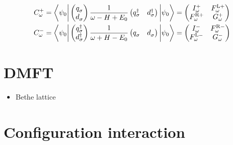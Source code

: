 \begin{subequations}
    \begin{align}
        C^+_\omega
         & =
        \biggl\langle \psi_0 \biggr|
        \begin{pmatrix}
            q^{\pdag}_\sigma \\
            d^{\pdag}_\sigma
        \end{pmatrix}
        \frac{1}{\omega - H + E_0}
        \begin{pmatrix}
            q^\dag_\sigma & d^\dag_\sigma
        \end{pmatrix}
        \biggl| \psi_0 \biggr\rangle
        =
        \begin{pmatrix}
            I^+_\omega      & F^{\mL+}_\omega \\
            F^{\mR+}_\omega & G^+_\omega
        \end{pmatrix} \\
        C^-_\omega
         & =
        \biggl\langle \psi_0 \biggr|
        \begin{pmatrix}
            q^\dag_\sigma \\
            d^\dag_\sigma
        \end{pmatrix}
        \frac{1}{\omega + H - E_0}
        \begin{pmatrix}
            q^{\pdag}_\sigma & d^{\pdag}_\sigma
        \end{pmatrix}
        \biggl| \psi_0 \biggr\rangle
        =
        \begin{pmatrix}
            I^-_\omega      & F^{\mR-}_\omega \\
            F^{\mL-}_\omega & G^-_\omega
        \end{pmatrix}
    \end{align}
\end{subequations}

\section{DMFT}

\begin{itemize}
    \item Bethe lattice
\end{itemize}

\section{Configuration interaction}
